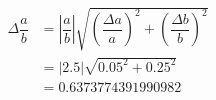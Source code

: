 \documentclass[a4paper]{article}
\begin{document}
\begin{align*}
\Delta \dfrac{ a }{ b } &= \left| \dfrac{ a }{ b } \right|\sqrt{ \left( \dfrac{ \Delta a }{ a } \right) ^ { 2 } + \left( \dfrac{ \Delta b }{ b } \right) ^ { 2 }} \\
&= \left| 2.5 \right|\sqrt{ 0.05 ^ { 2 } + 0.25 ^ { 2 }} \\
&= 0.6373774391990982
\end{align*}
\end{document}
